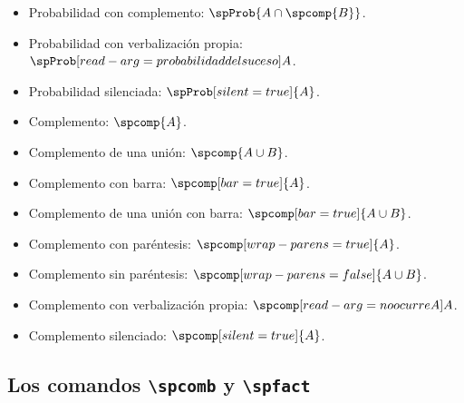 \documentclass{article}
\begin{document}
\begin{itemize}
  \item Probabilidad con complemento: $\spProb{A \cap \spcomp{B}}$.
  \item Probabilidad con verbalización propia: $\spProb[read-arg={probabilidad del suceso}]{A}$.
  \item Probabilidad silenciada: $\spProb[silent=true]{A}$.
  \item Complemento: $\spcomp{A}$.
  \item Complemento de una unión: $\spcomp{A \cup B}$.
  \item Complemento con barra: $\spcomp[bar=true]{A}$.
  \item Complemento de una unión con barra: $\spcomp[bar=true]{A \cup B}$.
  \item Complemento con paréntesis: $\spcomp[wrap-parens=true]{A}$.
  \item Complemento sin paréntesis: $\spcomp[wrap-parens=false]{A \cup B}$.
  \item Complemento con verbalización propia: $\spcomp[read-arg={no ocurre A}]{A}$.
  \item Complemento silenciado: $\spcomp[silent=true]{A}$.
\end{itemize}

\subsection*{Los comandos \texttt{\textbackslash spcomb} y \texttt{\textbackslash spfact}}
\end{document}
